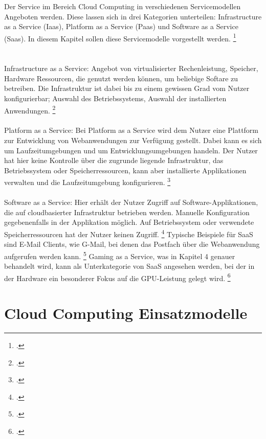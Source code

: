 \documentclass[12pt,toc=bib,toc=listof]{scrreprt}
\begin{document}
Der Service im Bereich Cloud Computing in verschiedenen Servicemodellen Angeboten werden. Diese lassen sich 
in drei Kategorien unterteilen:
 Infrastructure as a Service (Iaas), Platform as a Service (Paas) und Software as a Service (Saas). 
 In diesem Kapitel sollen diese Servicemodelle vorgestellt werden. \footcite [Vgl.] [] {Riasanow.2020}
 \\ 
\\ \\ 
Infrastructure as a Service: Angebot von virtualisierter Rechenleistung, Speicher, Hardware Ressourcen, die genutzt werden können, um beliebige Softare zu betreiben.
Die Infrastruktur ist dabei bis zu einem gewissen Grad vom Nutzer konfigurierbar; Auswahl des Betriebssystems, Auswahl der installierten Anwendungen. \footcite [Vgl.] [] {Riasanow.2020}
\\ \\
Platform as a Service: Bei Platform as a Service wird dem Nutzer eine Plattform zur Entwicklung von Webanwendungen zur Verfügung gestellt. Dabei kann es sich 
um Laufzeitumgebungen und um Entwicklungsumgebungen handeln. Der Nutzer hat hier keine Kontrolle über die zugrunde liegende Infrastruktur, 
das Betriebssystem oder Speicherressourcen, kann aber installierte Applikationen verwalten und die Laufzeitumgebung konfigurieren. \footcite [Vgl.] [] {Riasanow.2020}
\\ \\
Software as a Service: Hier erhält der Nutzer Zugriff auf Software-Applikationen, die auf cloudbasierter Infrastruktur betrieben werden.
Manuelle Konfiguration gegebenenfalls in der Applikation möglich. Auf Betriebssystem oder verwendete Speicherressourcen hat der Nutzer keinen Zugriff. \footcite [Vgl.] [] {Riasanow.2020}
Typische Beispiele für SaaS sind E-Mail Clients, wie G-Mail, bei denen das Postfach über die Webanwendung aufgerufen werden kann. \footcite [Vgl.] [] {MoroVisconti.2022}
Gaming as a Service, was in Kapitel 4 genauer behandelt wird, kann als Unterkategorie von SaaS angesehen werden, bei der in der Hardware ein besonderer Fokus auf die 
GPU-Leistung gelegt wird. \footcite [Vgl.] [] {Soliman.2013}

\section{Cloud Computing Einsatzmodelle} %
\label{sec:Cloud Computing Einsatzmodelle}
\end{document}

